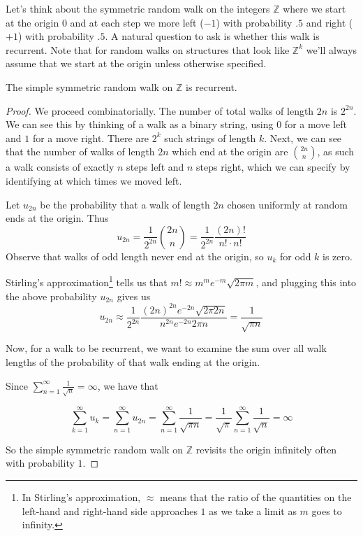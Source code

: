 



Let's think about the symmetric random walk on the integers $\mathbb{Z}$ where we start at the origin $0$ and at each step we more left ($-1$) with probability $.5$ and right ($+1$) with probability $.5$. A natural question to ask is whether this walk is recurrent.  Note that for random walks on structures that look like $\mathbb{Z}^k$ we'll always assume that we start at the origin unless otherwise specified.

\begin{claim}
	The simple symmetric random walk on $\mathbb{Z}$ is recurrent.
\end{claim}

\begin{proof}
	We proceed combinatorially.  The number of total walks of length $2n$ is $2^{2n}$.  We can see this by thinking of a walk as a binary string, using $0$ for a move left and $1$ for a move right.  There are $2^k$ such strings of length $k$.  Next, we can see that the number of walks of length $2n$ which end at the origin are $\binom{2n}{n}$, as such a walk consists of exactly $n$ steps left and $n$ steps right, which we can specify by identifying at which times we moved left.
	
	Let $u_{2n}$ be the probability that a walk of length $2n$ chosen uniformly at random ends at the origin.  Thus $$u_{2n}=\frac{1}{2^{2n}}\binom{2n}{n} = \frac{1}{2^{2n}} \frac{(2n)!}{n!\cdot n!} $$  Observe that walks of odd length never end at the origin, so $u_k$ for odd $k$ is zero.
	
	Stirling's approximation\footnote{In Stirling's approximation, $\approx$ means that the ratio of the quantities on the left-hand and right-hand side approaches $1$ as we take a limit as $m$ goes to infinity.} tells us that $m!\approx m^me^{-m}\sqrt{2\pi m}$, and plugging this into the above probability $u_{2n}$ gives us
	$$u_{2n}\approx \frac{1}{2^{2n}}\frac{(2n)^{2n}e^{-2n}\sqrt{2\pi 2n}}{n^{2n}e^{-2n}2\pi n} = \frac{1}{\sqrt{\pi n}}$$
	
	Now, for a walk to be recurrent, we want to examine the sum over all walk lengths of the probability of that walk ending at the origin.
	
	Since $\sum\limits_{n=1}^{\infty}\frac{1}{\sqrt{n}} = \infty$,	we have that
	
	$$\sum\limits_{k=1}^{\infty} u_k = \sum\limits_{n=1}^{\infty} u_{2n} = \sum\limits_{n=1}^{\infty} \frac{1}{\sqrt{\pi n}} = \frac{1}{\sqrt{\pi}}\sum\limits_{n=1}^{\infty} \frac{1}{\sqrt{n}} = \infty$$

	
	So the simple symmetric random walk on $\mathbb{Z}$ revisits the origin infinitely often with probability $1$.
	
\end{proof}

